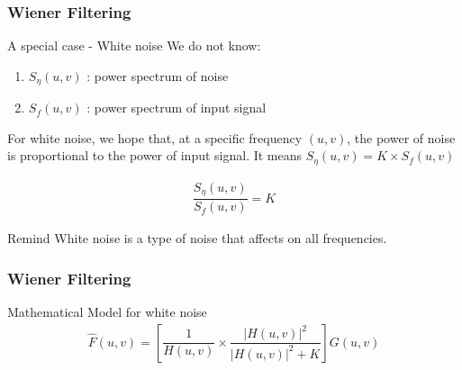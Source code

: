 \documentclass[english,11pt,table,handout]{beamer}
\begin{document}
\frame
{
	\frametitle{Wiener Filtering }
	
	\begin{block}{A special case - White noise}
		We do not know:
		\begin{enumerate}
			\item $S_{\eta}(u,v)$ : power spectrum of noise
			\item $S_{f}(u,v)$ : power spectrum of input signal
		\end{enumerate}
		For white noise, we hope that, at a specific frequency $(u,v)$, the power of noise is proportional to the power of input signal. It means $S_{\eta}(u,v) = K \times S_{f}(u,v)$
	
		\begin{align}
			\nonumber
			\dfrac{ S_{\eta}(u,v)}{S_{f}(u,v)} = K 
		\end{align}

	\end{block}
	\begin{alertblock}{Remind}
		White noise is a type of noise that affects on all frequencies.
	\end{alertblock}
}
\frame
{
	\frametitle{Wiener Filtering }
	
	\begin{block}{Mathematical Model for white noise}
		\begin{align}
		\nonumber
		\hat{F}(u,v) = \left[ \dfrac{1}{H(u,v)} \times 
		\dfrac{|H(u,v)|^2}{|H(u,v)|^2 + K}\right]G(u,v)
		\end{align}
	\end{block}
	
}
\end{document}
